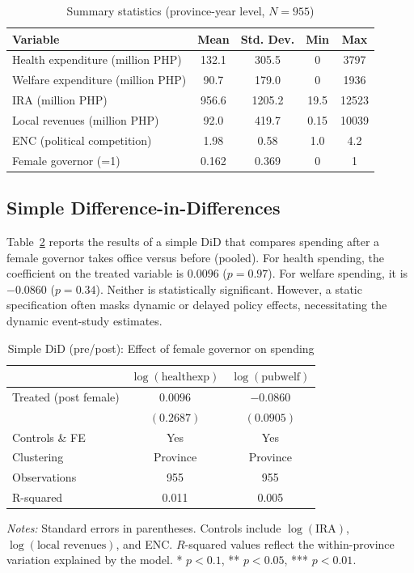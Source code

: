\documentclass[conference]{IEEEtran}
\begin{document}
\begin{table}[htbp]
\centering
\caption{Summary statistics (province-year level, $N=955$)}\label{tab:summary}
\begin{tabular}{lcccc}
\toprule
Variable & Mean & Std. Dev. & Min & Max \\
\midrule
Health expenditure (million PHP) & 132.1 & 305.5 & 0 & 3797 \\
Welfare expenditure (million PHP) & 90.7 & 179.0 & 0 & 1936 \\
IRA (million PHP) & 956.6 & 1205.2 & 19.5 & 12523 \\
Local revenues (million PHP) & 92.0 & 419.7 & 0.15 & 10039 \\
ENC (political competition) & 1.98 & 0.58 & 1.0 & 4.2 \\
Female governor (=1) & 0.162 & 0.369 & 0 & 1 \\
\bottomrule
\end{tabular}
\end{table}

\subsection{Simple Difference-in-Differences}
Table~\ref{tab:did} reports the results of a simple DiD that compares spending after a female governor takes office versus before (pooled). For health spending, the coefficient on the treated variable is $0.0096$ ($p=0.97$). For welfare spending, it is $-0.0860$ ($p=0.34$). Neither is statistically significant. However, a static specification often masks dynamic or delayed policy effects, necessitating the dynamic event-study estimates.

\begin{table}[htbp]
\centering
\caption{Simple DiD (pre/post): Effect of female governor on spending}\label{tab:did}
\begin{tabular}{lcc}
\toprule
 & $\log(\text{healthexp})$ & $\log(\text{pubwelf})$ \\
\midrule
Treated (post female) & $0.0096$ & $-0.0860$ \\
 & $(0.2687)$ & $(0.0905)$ \\
\addlinespace
Controls \& FE & Yes & Yes \\
Clustering & Province & Province \\
\addlinespace
Observations & 955 & 955 \\
R-squared & 0.011 & 0.005 \\
\bottomrule
\end{tabular}

\vspace{0.5em}
\parbox{0.95\columnwidth}{\footnotesize \textit{Notes:} Standard errors in parentheses. Controls include $\log(\text{IRA})$, $\log(\text{local revenues})$, and ENC. $R$-squared values reflect the within-province variation explained by the model. * $p<0.1$, ** $p<0.05$, *** $p<0.01$.}
\end{table}
\end{document}
